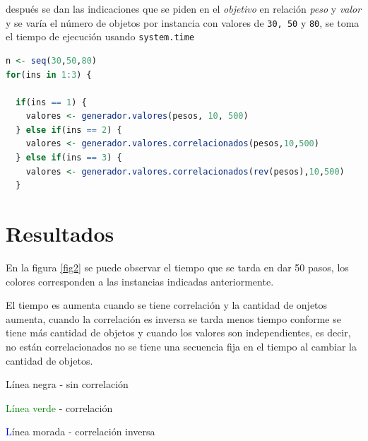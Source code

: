 \documentclass{article}
\begin{document}
después se dan las indicaciones que se piden en el \textit{objetivo} en relación \textit{peso} y \textit{valor} y se varía el número de objetos por instancia con valores de \texttt{30, 50} y \texttt{80}, se toma el tiempo de ejecución usando \texttt{system.time}

\begin{lstlisting}[language=R]
n <- seq(30,50,80)
for(ins in 1:3) {
  
  if(ins == 1) {
    valores <- generador.valores(pesos, 10, 500)
  } else if(ins == 2) {
    valores <- generador.valores.correlacionados(pesos,10,500)
  } else if(ins == 3) {
    valores <- generador.valores.correlacionados(rev(pesos),10,500)
  }
\end{lstlisting}

\newpage


\section{Resultados}
En la figura \ref{fig2} se puede observar el tiempo que se tarda en dar 50 pasos, los colores corresponden a las instancias indicadas anteriormente. \par 
El tiempo es aumenta cuando se tiene correlación y la cantidad de onjetos aumenta, cuando la correlación es inversa se tarda menos tiempo conforme se tiene más cantidad de objetos y cuando los valores son independientes, es decir, no están correlacionados no se tiene una secuencia fija en el tiempo al cambiar la cantidad de objetos. \par 
Línea negra - sin correlación \par
\textcolor{green}{Línea verde} - correlación \par
\textcolor{blue}Línea morada - correlación inversa
\end{document}
